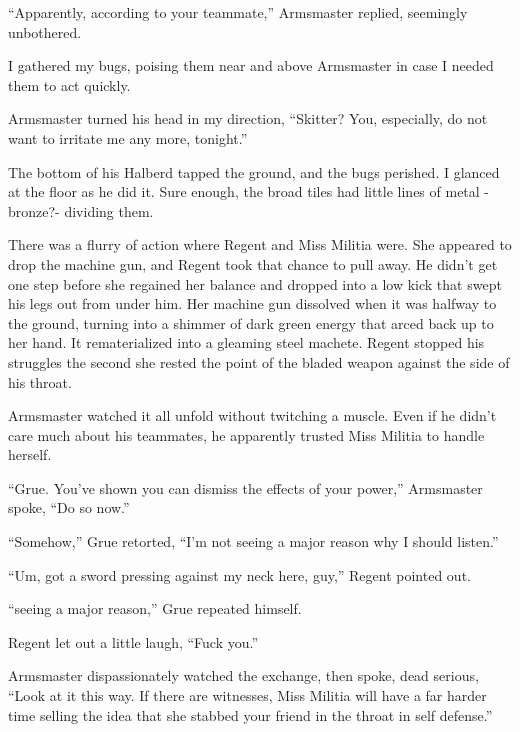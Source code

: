 ``Apparently, according to your teammate,'' Armsmaster replied, seemingly unbothered.



I gathered my bugs, poising them near and above Armsmaster in case I needed them to act quickly.



Armsmaster turned his head in my direction, ``Skitter?  You, especially, do not want to irritate me any more, tonight.''



The bottom of his Halberd tapped the ground, and the bugs perished.  I glanced at the floor as he did it.  Sure enough, the broad tiles had little lines of metal -bronze?- dividing them.



There was a flurry of action where Regent and Miss Militia were.  She appeared to drop the machine gun, and Regent took that chance to pull away.  He didn't get one step before she regained her balance and dropped into a low kick that swept his legs out from under him.  Her machine gun dissolved when it was halfway to the ground, turning into a shimmer of dark green energy that arced back up to her hand.  It rematerialized into a gleaming steel machete.  Regent stopped his struggles the second she rested the point of the bladed weapon against the side of his throat.



Armsmaster watched it all unfold without twitching a muscle.  Even if he didn't care much about his teammates, he apparently trusted Miss Militia to handle herself.



``Grue.  You've shown you can dismiss the effects of your power,'' Armsmaster spoke, ``Do so now.''



``Somehow,'' Grue retorted, ``I'm not seeing a major reason why I should listen.''



``Um, got a sword pressing against my neck here, guy,'' Regent pointed out.



``\ldotsNot seeing a major reason,'' Grue repeated himself.



Regent let out a little laugh, ``Fuck you.''



Armsmaster dispassionately watched the exchange, then spoke, dead serious, ``Look at it this way.  If there are witnesses, Miss Militia will have a far harder time selling the idea that she stabbed your friend in the throat in self defense.''



